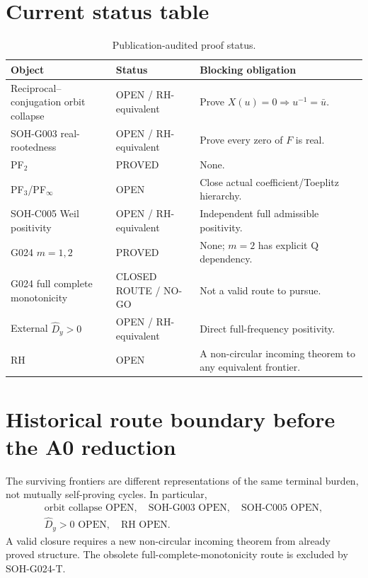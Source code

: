 \section{Current status table}
\begin{table}[htbp]
\centering\small
\begin{tabular}{p{}p{}p{}}
\toprule
Object & Status & Blocking obligation\\
\midrule
Reciprocal--conjugation orbit collapse & OPEN / RH-equivalent & Prove $X(u)=0\Rightarrow u^{-1}=\bar u$.\\
SOH-G003 real-rootedness & OPEN / RH-equivalent & Prove every zero of $F$ is real.\\
PF$_2$ & PROVED & None.\\
PF$_3$/PF$_\infty$ & OPEN & Close actual coefficient/Toeplitz hierarchy.\\
SOH-C005 Weil positivity & OPEN / RH-equivalent & Independent full admissible positivity.\\
G024 $m=1,2$ & PROVED & None; $m=2$ has explicit Q dependency.\\
G024 full complete monotonicity & CLOSED ROUTE / NO-GO & Not a valid route to pursue.\\
External $\widehat D_y>0$ & OPEN / RH-equivalent & Direct full-frequency positivity.\\
RH & OPEN & A non-circular incoming theorem to any equivalent frontier.\\
\bottomrule
\end{tabular}
\caption{Publication-audited proof status.}
\label{tab:current-proof-status}
\end{table}

\section{Historical route boundary before the A0 reduction}
The surviving frontiers are different representations of the same terminal burden, not mutually self-proving cycles. In particular,
\[
\begin{gathered}
\boxed{\text{orbit collapse OPEN}},\quad
\boxed{\text{SOH-G003 OPEN}},\quad
\boxed{\text{SOH-C005 OPEN}},\\
\boxed{\widehat D_y>0\text{ OPEN}},\quad
\boxed{\text{RH OPEN}}.
\end{gathered}
\]
A valid closure requires a new non-circular incoming theorem from already proved structure. The obsolete full-complete-monotonicity route is excluded by SOH-G024-T.
